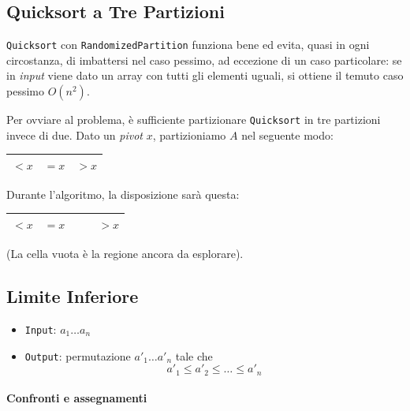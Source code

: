 \subsection{Quicksort a Tre Partizioni}
\texttt{Quicksort} con \texttt{RandomizedPartition} funziona bene ed 
evita, quasi in ogni circostanza, di imbattersi nel caso pessimo, ad 
eccezione di un caso particolare: se in \emph{input} viene dato un 
array con tutti gli elementi uguali, si ottiene il temuto caso pessimo $O(n^2)$.\par
Per ovviare al problema, è sufficiente partizionare \texttt{Quicksort} in tre
partizioni invece di due. Dato un \emph{pivot} $x$, partizioniamo $A$ nel
seguente modo:

\begin{center}
    \begin{tabular}{|l|l|l|}
        \hline 
        $< x$ & $= x$ & $> x$ \\
        \hline
    \end{tabular}
\end{center}

Durante l'algoritmo, la disposizione sarà questa:

\begin{center}
    \begin{tabular}{|l|l|l|l|}
        \hline 
        $< x$ & $= x$ & $\quad$ & $> x$ \\
        \hline
    \end{tabular}
\end{center}
(La cella vuota è la regione ancora da esplorare).

 



\subsection{Limite Inferiore}

\begin{itemize}[label=]
    \item \texttt{Input}: $a_1 \dots a_n$
    \item \texttt{Output}: permutazione $a'_1 \dots a'_n$ tale che
    $$a'_1 \leq a'_2 \leq \dots \leq a'_n$$
\end{itemize}

\paragraph{Confronti e assegnamenti} 

